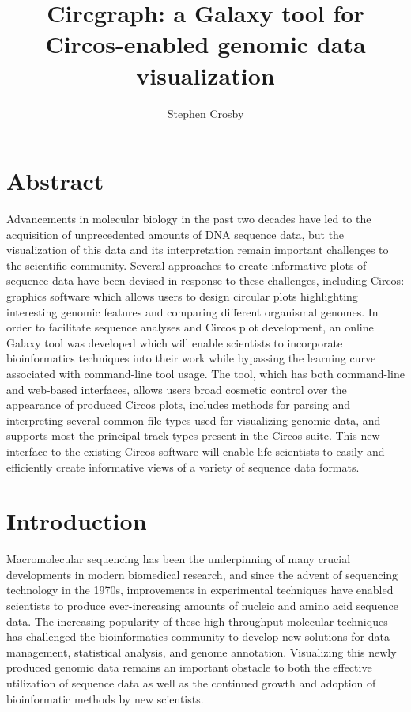 \documentclass{article}
\title{Circgraph: a Galaxy tool for Circos-enabled genomic data visualization}
\author{Stephen Crosby}
\begin{document}
\maketitle
\section*{Abstract}
Advancements in molecular biology in the past two decades have led to the acquisition of
unprecedented amounts of DNA sequence data, but the visualization of this data and its
interpretation remain important challenges to the scientific community. Several approaches to
create informative plots of sequence data have been devised in response to these challenges, 
including Circos: graphics software which allows users to design circular plots highlighting
interesting genomic features and comparing different organismal genomes. In order to facilitate sequence analyses and Circos plot development, an online Galaxy tool was developed which
will enable scientists to incorporate bioinformatics techniques into their work while bypassing the learning curve associated with command-line tool usage. The tool, which has both command-line and web-based interfaces, allows users broad cosmetic control over the appearance of produced Circos plots, includes methods for parsing and interpreting several common file types used for visualizing genomic data, and supports most the principal track types present in the Circos suite. This new interface to the existing Circos software will enable life scientists to easily and efficiently create informative views of a variety of sequence data formats.

\section*{Introduction}
Macromolecular sequencing has been the underpinning of many crucial developments in modern biomedical research, and since the advent of sequencing technology in the 1970s, improvements in experimental techniques have enabled scientists to produce ever-increasing amounts of nucleic and amino acid sequence data. The increasing popularity of these high-throughput molecular techniques has challenged the bioinformatics community to develop new solutions for data-management, statistical analysis, and genome annotation. Visualizing this newly produced genomic data remains an important obstacle to both the effective utilization of sequence data as well as the continued growth and adoption of bioinformatic methods by new scientists.  
\end{document}
